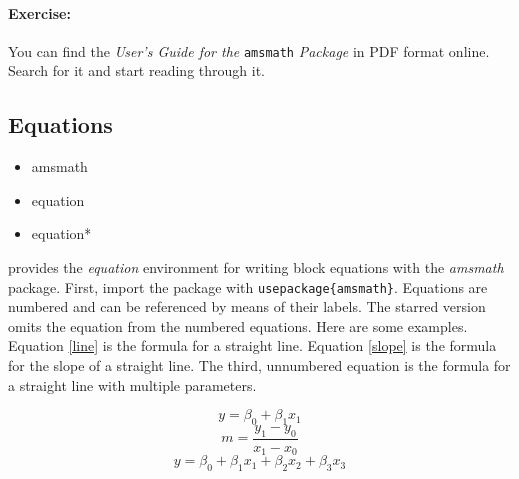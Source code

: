 		\paragraph{Exercise:} You can find the \textit{User's Guide for the }\texttt{amsmath} \textit{Package} in PDF format online. Search for it and start reading through it.

        \subsection{Equations}
        \label{Equations}
        
        \begin{framed}
            \begin{itemize}
                \item{amsmath}
                \item{equation}
                \item{equation*}
            \end{itemize}
        \end{framed}
	
		\Lx{} provides the \textit{equation} environment for writing block equations with the \textit{amsmath} package. First, import the package with \texttt{usepackage\{amsmath\}}.  Equations are numbered and can be referenced by means of their labels. The starred version omits the equation from the numbered equations. Here are some examples. Equation \ref{line} is the formula for a straight line. Equation \ref{slope} is the formula for the slope of a straight line.  The third, unnumbered equation is the formula for a straight line with multiple parameters.

		\begin{equation}
			\label{line}
			y = \beta_0 + \beta_1 x_1
		\end{equation}
		\begin{equation}
			\label{slope}
			m = \frac{y_1 - y_0}{x_1 - x_0}
		\end{equation}
		\begin{equation*}
			y = \beta_0 + \beta_1 x_1 + \beta_2 x_2 + \beta_3 x_3
		\end{equation*}

